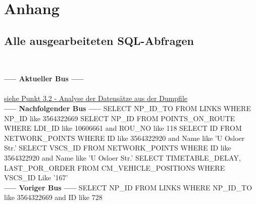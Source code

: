 \documentclass[a4paper, 12.5pt]{scrartcl}
\begin{document}
\section{Anhang}

\subsection{Alle ausgearbeiteten SQL-Abfragen}
\\
\begin{small}
\textbf{----- Aktueller Bus -----}
\\ \\
\hyperref[sec:jump]{siehe Punkt 3.2 - Analyse der Datensätze aus der Dumpfile}
\newline 
\\ \textbf{----- Nachfolgender Bus -----}
\newline 
\newline SELECT NP\_ID\_TO
\newline FROM LINKS
\newline WHERE NP\_ID like 3564322669
\newline 
\newline SELECT NP\_ID
\newline FROM POINTS\_ON\_ROUTE
\newline WHERE LDI\_ID like 10606661 and ROU\_NO like 118
\newline 
\newline SELECT ID
\newline FROM NETWORK\_POINTS
\newline WHERE ID like 3564322920 and Name like 'U Osloer Str.' 
\newline 
\newline SELECT VSCS\_ID
\newline FROM NETWORK\_POINTS
\newline WHERE ID like 3564322920 and Name like 'U Osloer Str.'
\newline 
\newline SELECT TIMETABLE\_DELAY, LAST\_POR\_ORDER
\newline FROM CM\_VEHICLE\_POSITIONS
\newline WHERE VSCS\_ID Like '167'
\newline 
\\ \textbf{----- Voriger Bus -----}
\newline 
\newline SELECT NP\_ID
\newline FROM LINKS
\newline WHERE NP\_ID\_TO like 3564322669 and ID like 728

\end{small}
\end{document}

